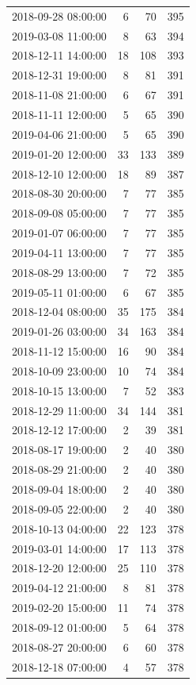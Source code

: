 \begin{tabular}{lrrr}
2018-09-28 08:00:00 & 6 & 70 & 395 \\
2019-03-08 11:00:00 & 8 & 63 & 394 \\
2018-12-11 14:00:00 & 18 & 108 & 393 \\
2018-12-31 19:00:00 & 8 & 81 & 391 \\
2018-11-08 21:00:00 & 6 & 67 & 391 \\
2018-11-11 12:00:00 & 5 & 65 & 390 \\
2019-04-06 21:00:00 & 5 & 65 & 390 \\
2019-01-20 12:00:00 & 33 & 133 & 389 \\
2018-12-10 12:00:00 & 18 & 89 & 387 \\
2018-08-30 20:00:00 & 7 & 77 & 385 \\
2018-09-08 05:00:00 & 7 & 77 & 385 \\
2019-01-07 06:00:00 & 7 & 77 & 385 \\
2019-04-11 13:00:00 & 7 & 77 & 385 \\
2018-08-29 13:00:00 & 7 & 72 & 385 \\
2019-05-11 01:00:00 & 6 & 67 & 385 \\
2018-12-04 08:00:00 & 35 & 175 & 384 \\
2019-01-26 03:00:00 & 34 & 163 & 384 \\
2018-11-12 15:00:00 & 16 & 90 & 384 \\
2018-10-09 23:00:00 & 10 & 74 & 384 \\
2018-10-15 13:00:00 & 7 & 52 & 383 \\
2018-12-29 11:00:00 & 34 & 144 & 381 \\
2018-12-12 17:00:00 & 2 & 39 & 381 \\
2018-08-17 19:00:00 & 2 & 40 & 380 \\
2018-08-29 21:00:00 & 2 & 40 & 380 \\
2018-09-04 18:00:00 & 2 & 40 & 380 \\
2018-09-05 22:00:00 & 2 & 40 & 380 \\
2018-10-13 04:00:00 & 22 & 123 & 378 \\
2019-03-01 14:00:00 & 17 & 113 & 378 \\
2018-12-20 12:00:00 & 25 & 110 & 378 \\
2019-04-12 21:00:00 & 8 & 81 & 378 \\
2019-02-20 15:00:00 & 11 & 74 & 378 \\
2018-09-12 01:00:00 & 5 & 64 & 378 \\
2018-08-27 20:00:00 & 6 & 60 & 378 \\
2018-12-18 07:00:00 & 4 & 57 & 378 \\

\end{tabular}
